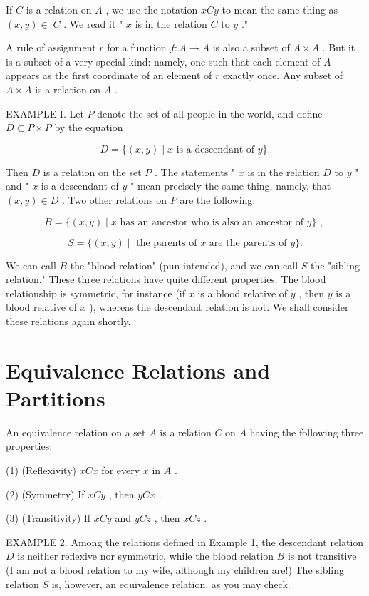 \documentclass[10pt]{article}
\begin{document}
If \(C\) is a relation on \(A\) , we use the notation \({xCy}\) to mean the same thing as \(\left( {x,y}\right)  \in \; C\) . We read it " \(x\) is in the relation \(C\) to \(y\) ."

A rule of assignment \(r\) for a function \(f : A \rightarrow  A\) is also a subset of \(A \times  A\) . But it is a subset of a very special kind: namely, one such that each element of \(A\) appears as the first coordinate of an element of \(r\) exactly once. Any subset of \(A \times  A\) is a relation on \(A\) .

EXAMPLE I. Let \(P\) denote the set of all people in the world, and define \(D \subset  P \times  P\) by the equation

\[
D = \{ \left( {x,y}\right)  \mid  x\text{ is a descendant of }y\} .
\]

Then \(D\) is a relation on the set \(P\) . The statements " \(x\) is in the relation \(D\) to \(y\) " and " \(x\) is a descendant of \(y\) " mean precisely the same thing, namely, that \(\left( {x,y}\right)  \in  D\) . Two other relations on \(P\) are the following:

\[
B = \{ \left( {x,y}\right)  \mid  x\text{ has an ancestor who is also an ancestor of }y\} \text{ , }
\]

\[
S = \{ \left( {x,y}\right)  \mid  \text{ the parents of }x\text{ are the parents of }y\} .
\]

We can call \(B\) the "blood relation" (pun intended), and we can call \(S\) the "sibling relation." These three relations have quite different properties. The blood relationship is symmetric, for instance (if \(x\) is a blood relative of \(y\) , then \(y\) is a blood relative of \(x\) ), whereas the descendant relation is not. We shall consider these relations again shortly.

\section*{Equivalence Relations and Partitions}

An equivalence relation on a set \(A\) is a relation \(C\) on \(A\) having the following three properties:

(1) (Reflexivity) \({xCx}\) for every \(x\) in \(A\) .

(2) (Symmetry) If \({xCy}\) , then \({yCx}\) .

(3) (Transitivity) If \({xCy}\) and \({yCz}\) , then \({xCz}\) .

EXAMPLE 2. Among the relations defined in Example 1, the descendant relation \(D\) is neither reflexive nor symmetric, while the blood relation \(B\) is not transitive (I am not a blood relation to my wife, although my children are!) The sibling relation \(S\) is, however, an equivalence relation, as you may check.
\end{document}
